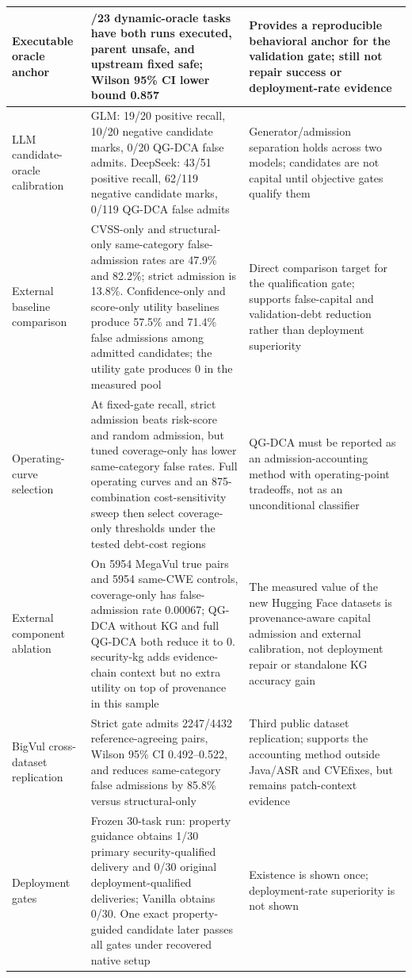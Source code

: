﻿\documentclass[lettersize,journal]{IEEEtran}
\begin{document}
\begin{table}[!t]
{\begin{tabular}{|>{\raggedright\arraybackslash}p{1.35in}|>{\raggedright\arraybackslash}p{2.25in}|>{\raggedright\arraybackslash}p{2.7in}|}
\hline
Executable oracle anchor & 23/23 dynamic-oracle tasks have both runs executed, parent unsafe, and upstream fixed safe; Wilson 95\% CI lower bound 0.857 & Provides a reproducible behavioral anchor for the validation gate; still not repair success or deployment-rate evidence \\
\hline
LLM candidate-oracle calibration & GLM: 19/20 positive recall, 10/20 negative candidate marks, 0/20 QG-DCA false admits. DeepSeek: 43/51 positive recall, 62/119 negative candidate marks, 0/119 QG-DCA false admits & Generator/admission separation holds across two models; candidates are not capital until objective gates qualify them \\
\hline
External baseline comparison & CVSS-only and structural-only same-category false-admission rates are 47.9\% and 82.2\%; strict admission is 13.8\%. Confidence-only and score-only utility baselines produce 57.5\% and 71.4\% false admissions among admitted candidates; the utility gate produces 0 in the measured pool & Direct comparison target for the qualification gate; supports false-capital and validation-debt reduction rather than deployment superiority \\
\hline
Operating-curve selection & At fixed-gate recall, strict admission beats risk-score and random admission, but tuned coverage-only has lower same-category false rates. Full operating curves and an 875-combination cost-sensitivity sweep then select coverage-only thresholds under the tested debt-cost regions & QG-DCA must be reported as an admission-accounting method with operating-point tradeoffs, not as an unconditional classifier \\
\hline
External component ablation & On 5954 MegaVul true pairs and 5954 same-CWE controls, coverage-only has false-admission rate 0.00067; QG-DCA without KG and full QG-DCA both reduce it to 0. security-kg adds evidence-chain context but no extra utility on top of provenance in this sample & The measured value of the new Hugging Face datasets is provenance-aware capital admission and external calibration, not deployment repair or standalone KG accuracy gain \\
\hline
BigVul cross-dataset replication & Strict gate admits 2247/4432 reference-agreeing pairs, Wilson 95\% CI 0.492--0.522, and reduces same-category false admissions by 85.8\% versus structural-only & Third public dataset replication; supports the accounting method outside Java/ASR and CVEfixes, but remains patch-context evidence \\
\hline
Deployment gates & Frozen 30-task run: property guidance obtains 1/30 primary security-qualified delivery and 0/30 original deployment-qualified deliveries; Vanilla obtains 0/30. One exact property-guided candidate later passes all gates under recovered native setup & Existence is shown once; deployment-rate superiority is not shown \\
\hline
\end{tabular}
}
\end{table}
\end{document}
